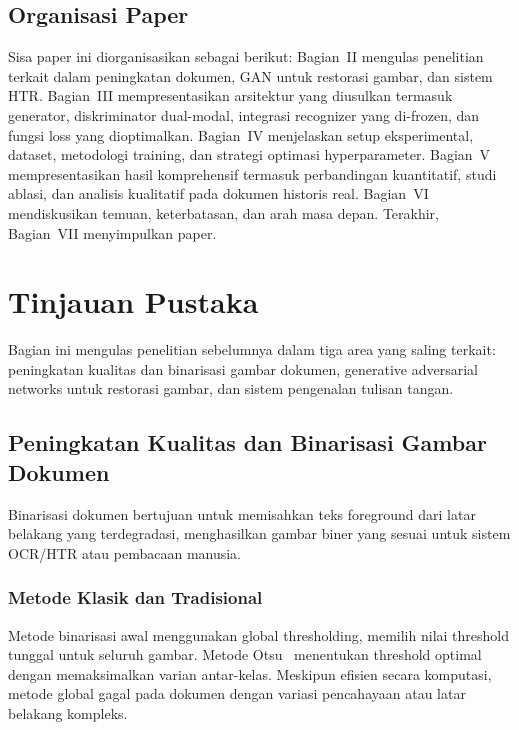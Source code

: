 \documentclass[journal]{IEEEtran}
\begin{document}
\subsection{Organisasi Paper}

Sisa paper ini diorganisasikan sebagai berikut: Bagian~II mengulas penelitian terkait dalam peningkatan dokumen, GAN untuk restorasi gambar, dan sistem HTR. Bagian~III mempresentasikan arsitektur yang diusulkan termasuk generator, diskriminator dual-modal, integrasi recognizer yang di-frozen, dan fungsi loss yang dioptimalkan. Bagian~IV menjelaskan setup eksperimental, dataset, metodologi training, dan strategi optimasi hyperparameter. Bagian~V mempresentasikan hasil komprehensif termasuk perbandingan kuantitatif, studi ablasi, dan analisis kualitatif pada dokumen historis real. Bagian~VI mendiskusikan temuan, keterbatasan, dan arah masa depan. Terakhir, Bagian~VII menyimpulkan paper.

\section{Tinjauan Pustaka}

Bagian ini mengulas penelitian sebelumnya dalam tiga area yang saling terkait: peningkatan kualitas dan binarisasi gambar dokumen, generative adversarial networks untuk restorasi gambar, dan sistem pengenalan tulisan tangan.

\subsection{Peningkatan Kualitas dan Binarisasi Gambar Dokumen}

Binarisasi dokumen bertujuan untuk memisahkan teks foreground dari latar belakang yang terdegradasi, menghasilkan gambar biner yang sesuai untuk sistem OCR/HTR atau pembacaan manusia.

\subsubsection{Metode Klasik dan Tradisional}

Metode binarisasi awal menggunakan global thresholding, memilih nilai threshold tunggal untuk seluruh gambar. Metode Otsu~\cite{otsu1979threshold} menentukan threshold optimal dengan memaksimalkan varian antar-kelas. Meskipun efisien secara komputasi, metode global gagal pada dokumen dengan variasi pencahayaan atau latar belakang kompleks.
\end{document}
